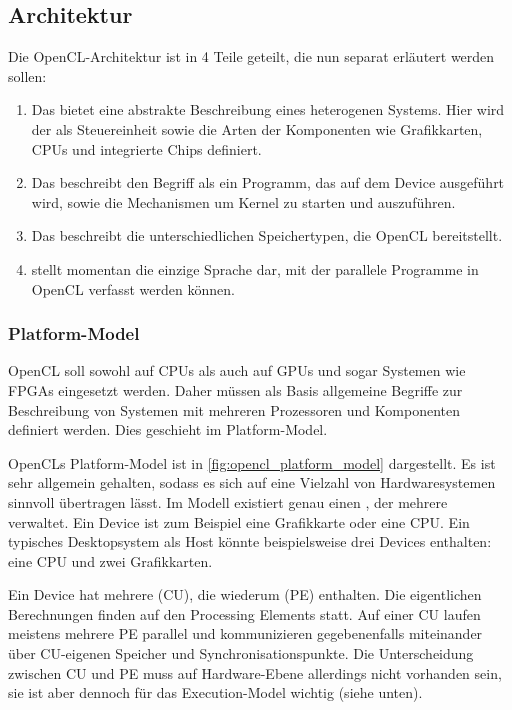 \subsection{Architektur}

Die OpenCL-Architektur ist in 4 Teile geteilt, die nun separat
erläutert werden sollen:

\begin{enumerate}
\item Das  bietet eine abstrakte
Beschreibung eines heterogenen Systems. Hier wird der
 als Steuereinheit sowie die Arten der
Komponenten wie Grafikkarten, CPUs und integrierte Chips definiert.
\item Das  beschreibt den Begriff
 als ein Programm, das auf dem Device ausgeführt wird, sowie die
Mechanismen um Kernel zu starten und auszuführen.
\item Das  beschreibt die unterschiedlichen Speichertypen, die
OpenCL bereitstellt.
\item {} stellt momentan die einzige Sprache
dar, mit der parallele Programme in OpenCL verfasst werden können.
\end{enumerate}

\subsubsection{Platform-Model}

OpenCL soll sowohl auf CPUs als auch auf GPUs und sogar
 Systemen wie FPGAs eingesetzt
werden. Daher müssen als Basis allgemeine Begriffe zur Beschreibung
von Systemen mit mehreren Prozessoren und Komponenten definiert
werden. Dies geschieht im Platform-Model.

OpenCLs Platform-Model ist in \cref{fig:opencl_platform_model}
dargestellt. Es ist sehr allgemein gehalten, sodass es sich auf eine
Vielzahl von Hardwaresystemen sinnvoll übertragen lässt. Im Modell
existiert genau einen , der mehrere
 verwaltet. Ein Device ist zum Beispiel eine
Grafikkarte oder eine CPU\@. Ein typisches Desktopsystem als Host könnte
beispielsweise drei Devices enthalten: eine CPU und zwei Grafikkarten.

Ein Device hat mehrere  (CU), die
wiederum  (PE) enthalten. Die
eigentlichen Berechnungen finden auf den Processing Elements
statt. Auf einer CU laufen meistens mehrere PE parallel und
kommunizieren gegebenenfalls miteinander über CU-eigenen Speicher und
Synchronisationspunkte. Die Unterscheidung zwischen CU und PE muss auf
Hardware-Ebene allerdings nicht vorhanden sein, sie ist aber dennoch
für das Execution-Model wichtig (siehe unten).

